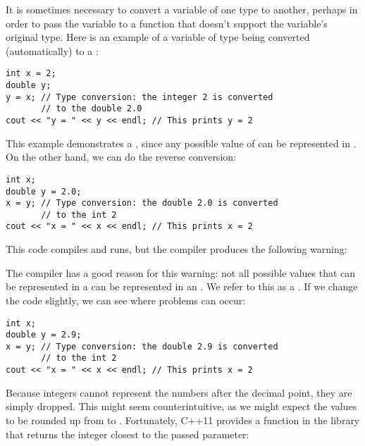 It is sometimes necessary to convert a variable of one type to another, perhaps in order to pass the variable to a function that doesn't support the variable's original type. 
Here is an example of a variable of type  being converted (automatically) to a :

\noindent\begin{minipage}{\linewidth}\begin{lstlisting}
int x = 2;
double y;
y = x; // Type conversion: the integer 2 is converted 
       // to the double 2.0
cout << "y = " << y << endl; // This prints y = 2
\end{lstlisting}\end{minipage}

This example demonstrates a , since any possible value of  can be represented in . 
On the other hand, we can do the reverse conversion:

\noindent\begin{minipage}{\linewidth}\begin{lstlisting}
int x;
double y = 2.0;
x = y; // Type conversion: the double 2.0 is converted 
       // to the int 2
cout << "x = " << x << endl; // This prints x = 2
\end{lstlisting}\end{minipage}

\noindent This code compiles and runs, but the compiler produces the following warning:

\noindent {}

The compiler has a good reason for this warning: not all possible values that can be represented in a  can be represented in an . 
We refer to this as a . 
If we change the code slightly, we can see where problems can occur:

\noindent\begin{minipage}{\linewidth}\begin{lstlisting}
int x;
double y = 2.9;
x = y; // Type conversion: the double 2.9 is converted 
       // to the int 2
cout << "x = " << x << endl; // This prints x = 2
\end{lstlisting}\end{minipage}

Because integers cannot represent the numbers after the decimal point, they are simply dropped. 
This might seem counterintuitive, as we might expect the values to be rounded up from  to . 
Fortunately, C++11 provides a  function in the  library that returns the integer closest to the passed parameter:

